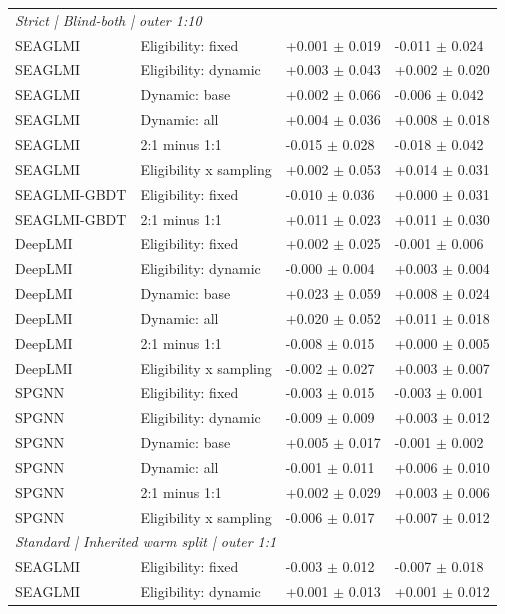 {\begin{longtable}{llll}
\multicolumn{4}{l}{\textit{Strict | Blind-both | outer 1:10}}\\
SEAGLMI & Eligibility: fixed & +0.001 $\pm$ 0.019 & -0.011 $\pm$ 0.024 \\
SEAGLMI & Eligibility: dynamic & +0.003 $\pm$ 0.043 & +0.002 $\pm$ 0.020 \\
SEAGLMI & Dynamic: base & +0.002 $\pm$ 0.066 & -0.006 $\pm$ 0.042 \\
SEAGLMI & Dynamic: all & +0.004 $\pm$ 0.036 & +0.008 $\pm$ 0.018 \\
SEAGLMI & 2:1 minus 1:1 & -0.015 $\pm$ 0.028 & -0.018 $\pm$ 0.042 \\
SEAGLMI & Eligibility x sampling & +0.002 $\pm$ 0.053 & +0.014 $\pm$ 0.031 \\
SEAGLMI-GBDT & Eligibility: fixed & -0.010 $\pm$ 0.036 & +0.000 $\pm$ 0.031 \\
SEAGLMI-GBDT & 2:1 minus 1:1 & +0.011 $\pm$ 0.023 & +0.011 $\pm$ 0.030 \\
DeepLMI & Eligibility: fixed & +0.002 $\pm$ 0.025 & -0.001 $\pm$ 0.006 \\
DeepLMI & Eligibility: dynamic & -0.000 $\pm$ 0.004 & +0.003 $\pm$ 0.004 \\
DeepLMI & Dynamic: base & +0.023 $\pm$ 0.059 & +0.008 $\pm$ 0.024 \\
DeepLMI & Dynamic: all & +0.020 $\pm$ 0.052 & +0.011 $\pm$ 0.018 \\
DeepLMI & 2:1 minus 1:1 & -0.008 $\pm$ 0.015 & +0.000 $\pm$ 0.005 \\
DeepLMI & Eligibility x sampling & -0.002 $\pm$ 0.027 & +0.003 $\pm$ 0.007 \\
SPGNN & Eligibility: fixed & -0.003 $\pm$ 0.015 & -0.003 $\pm$ 0.001 \\
SPGNN & Eligibility: dynamic & -0.009 $\pm$ 0.009 & +0.003 $\pm$ 0.012 \\
SPGNN & Dynamic: base & +0.005 $\pm$ 0.017 & -0.001 $\pm$ 0.002 \\
SPGNN & Dynamic: all & -0.001 $\pm$ 0.011 & +0.006 $\pm$ 0.010 \\
SPGNN & 2:1 minus 1:1 & +0.002 $\pm$ 0.029 & +0.003 $\pm$ 0.006 \\
SPGNN & Eligibility x sampling & -0.006 $\pm$ 0.017 & +0.007 $\pm$ 0.012 \\
\multicolumn{4}{l}{\textit{Standard | Inherited warm split | outer 1:1}}\\
SEAGLMI & Eligibility: fixed & -0.003 $\pm$ 0.012 & -0.007 $\pm$ 0.018 \\
SEAGLMI & Eligibility: dynamic & +0.001 $\pm$ 0.013 & +0.001 $\pm$ 0.012 \\

\end{longtable}}
